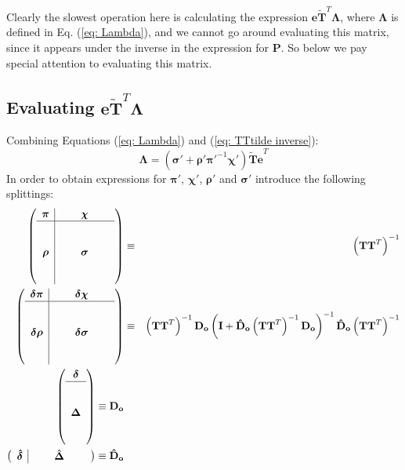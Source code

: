 \documentclass{article}
\begin{document}
Clearly the slowest operation here is calculating the expression 
$\mathbf{e\tilde{T}}^T\boldsymbol{\Lambda}$, where $\boldsymbol{\Lambda}$ is
defined in Eq. (\ref{eq: Lambda}), and we cannot go
around evaluating this matrix, since it appears under the inverse in the
expression for $\mathbf{P}$. So below we pay special attention to evaluating
this matrix.

\subsection{Evaluating $\mathbf{e\tilde{T}}^T\boldsymbol{\Lambda}$}
Combining Equations (\ref{eq: Lambda}) and (\ref{eq: TTtilde inverse}):
\begin{equation}
	\boldsymbol{\Lambda}=\left(\boldsymbol{\sigma}'+
	\boldsymbol{\rho}'\boldsymbol{\pi}'^{-1}\boldsymbol{\chi}'\right)
	\mathbf{\tilde{T}e}^T
\end{equation}
In order to obtain expressions for $\boldsymbol{\pi}'$, $\boldsymbol{\chi}'$,
$\boldsymbol{\rho}'$ and $\boldsymbol{\sigma}'$ introduce the following
splittings:
\begin{eqnarray*}
	\left(\begin{array}{c|ccc}
		\boldsymbol{\pi} & {\quad } & \boldsymbol{\chi} & {\quad } \\
		\hline\\
		{} & {} & {}\\
		\boldsymbol{\rho} & {\quad } & \boldsymbol{\sigma} &
		{\quad }\\ 
		{} & {} & {}\\
		{} & {} & {}\\
	\end{array}\right)
	&\equiv&\left(\mathbf{TT}^T\right)^{-1}	
	\\
	\left(\begin{array}{c|ccc}
		\boldsymbol{\delta\pi} & {\quad } & \boldsymbol{\delta\chi} & 
		{\quad } \\
		\hline\\
		{} & {} & {}\\
		\boldsymbol{\delta\rho} & {\quad } & \boldsymbol{\delta\sigma} &
		{\quad }\\ 
		{} & {} & {}\\
		{} & {} & {}\\
	\end{array}\right)
	&\equiv&
	\left(\mathbf{TT}^T\right)^{-1}\mathbf{D_o}\left(\mathbf{I}+
	\mathbf{\hat{D}_o}\left(\mathbf{TT}^T\right)^{-1}\mathbf{D_o}
	\right)^{-1}\mathbf{\hat{D}_o}\left(\mathbf{TT}^T\right)^{-1}
	\\
	\left(\begin{array}{c}
		\boldsymbol{\delta}\\ \hline\\ {}\\ \boldsymbol{\Delta}\\ {}\\ {}
	\end{array} \right)\equiv \mathbf{D_o}
	\\
	\left(\begin{array}{c|ccc}
		\boldsymbol{\hat{\delta}}& {\quad} & \boldsymbol{\hat{\Delta}} &
		{\quad}
	\end{array} \right)\equiv \mathbf{\hat{D}_o}
\end{eqnarray*}
\end{document}
